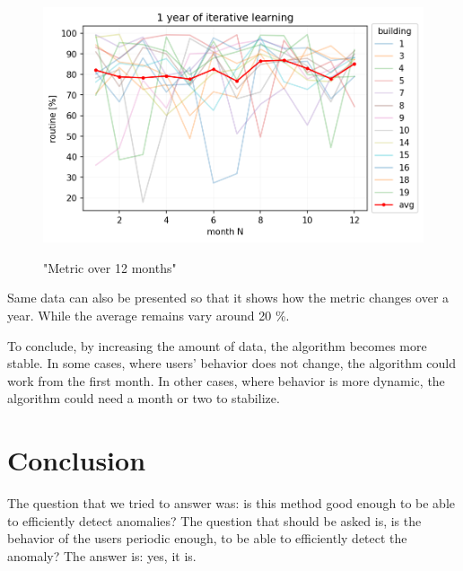 \begin{figure}[H]
	\centering
	\caption{"Metric over 12 months"}
	\includegraphics[width=.7\textwidth]{Figures/EC/DYN/1_year_of_iterative_learning_avg.png}
	\label{fig:1_year_of_iterative_learning_avg}
\end{figure}

Same data can also be presented so that it shows how the metric changes 
over a year. While the average remains vary around 20 \%. 

To conclude, by increasing the amount of data, the algorithm becomes more stable.
In some cases, where users' behavior does not change, the algorithm could work
from the first month. In other cases, where behavior is more dynamic, 
the algorithm could need a month or two to stabilize. 


\section{Conclusion}

The question that we tried to answer was:
is this method good enough to be able to efficiently detect anomalies? 
The question that should be asked is,
is the behavior of the users periodic enough, to 
be able to efficiently detect the anomaly?
The answer is: yes, it is.


